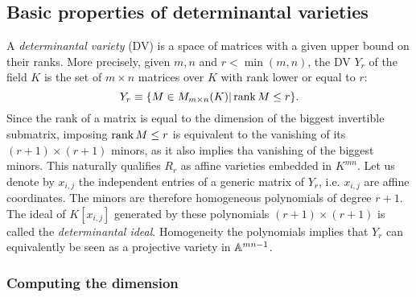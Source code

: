     \subsection{Basic properties of determinantal varieties}  

            A \emph{determinantal variety} (DV) is a space of matrices with a given upper bound on their ranks. More precisely, given $m,n$ and $r<\min(m,n)$, the DV $Y_r$ of the field $K$ is the set of $m\times n$ matrices over $K$ with rank lower or equal to $r$:
            \begin{equation}
                Y_r\equiv\{M\in M_{m\times n}(K)|\rank M\leq r\}.
            \end{equation}
            Since the rank of a matrix is equal to the dimension of the biggest invertible submatrix, imposing $\rank M\leq r$ is equivalent to the vanishing of its $(r+1)\times (r+1)$ minors, as it also implies tha vanishing of the biggest minors. This naturally qualifies $R_r$ as affine varieties embedded in $K^{mn}$. Let us denote by $x_{i,j}$ the independent entries of a generic matrix of $Y_r$, i.e. $x_{i,j}$ are affine coordinates. The minors are therefore homogeneous polynomials of degree $r+1$. The ideal of $K[x_{i,j}]$ generated by these polynomials $(r+1)\times(r+1)$ is called the \emph{determinantal ideal}. Homogeneity the polynomials implies that $Y_r$ can equivalently be seen as a projective variety in $\mathbb{A}^{mn-1}$.

        \subsubsection{Computing the dimension}
            
